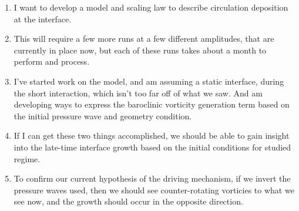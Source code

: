 \begin{frame}
{{\begin{enumerate}
        for circulation driven growth and our computational results
        which grow slightly faster.
      \item I want to develop a model and scaling law to describe circulation deposition at the interface.
      \item This will require a few more runs at a few different
        amplitudes, that are currently in place now, but each of these
        runs takes about a month to perform and process.
      \item I've started work on the model, and am assuming a static
        interface, during the short interaction, which isn't too far off
        of what we saw. And am developing ways to express the baroclinic
        vorticity generation term based on the initial pressure wave and
        geometry condition.
      \item If I can get these two things accomplished, we should be
        able to gain insight into the late-time interface growth based
        on the initial conditions for studied regime.
      \item To confirm our current hypothesis of the driving mechanism,
        if we invert the pressure waves used, then we should see
        counter-rotating vorticies to what we see now, and the growth
        should occur in the opposite direction.
      \end{enumerate}
    }
  }
\end{frame}
% 
